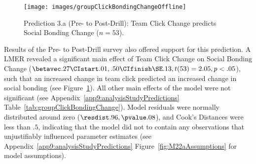 \begin{CJK}{UTF8}{gbsn}


\begin{figure}
  \centering
    \texttt{[image: images/groupClickBondingChangeOffline]}
      \caption{Prediction 3.a (Pre- to Post-Drill): Team Click Change predicts Social Bonding Change ($n = 53$).}
    \label{fig:groupClickBondingChangeOffline}

\end{figure}


Results of the Pre- to Post-Drill survey also offered support for this prediction.  A LMER revealed a significant main effect of Team Click Change on Social Bonding Change ($\betavec .27 \CIstart .01, .50 \CIfinish \SE .13, t(53) = 2.05, p < .05$), such that an increased change in team click predicted an increased change in social bonding (see Figure~\ref{fig:groupClickBondingChangeOffline}).  All other main effects of the model were not significant (see Appendix~\ref{app9:analysisStudyPredictions} Table~\ref{tab:groupClickBondingChange}).  Model residuals were normally distributed around zero ($\resdist .96, \pvalue .08$), and Cook's Distances were less than $.5$, indicating that the model did not to contain any observations that unjustifiably influenced parameter estimates (see Appendix~\ref{app9:analysisStudyPredictions} Figure~\ref{fig:M22aAssumptions} for model assumptions).




\end{CJK}
